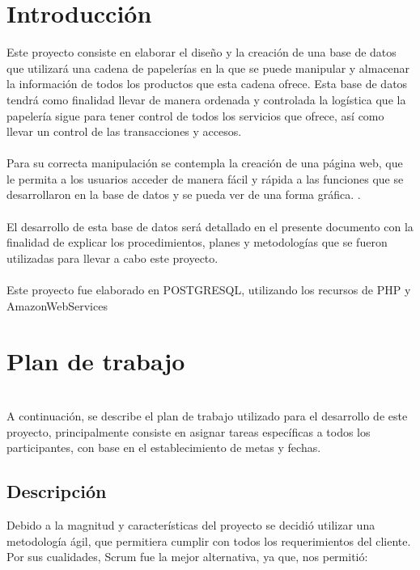 \documentclass[12pt,letterpaper]{article}
\begin{document}
	\restoregeometry
	\tableofcontents
	
	\newpage
	\section{Introducción}
	Este proyecto consiste en elaborar el diseño y la creación de una base de datos que utilizará una cadena de papelerías en la que se puede manipular y almacenar la información de todos los productos que esta cadena ofrece. Esta base de datos tendrá como finalidad llevar de manera ordenada y controlada la logística que la papelería sigue para tener control de todos los servicios que ofrece, así como llevar un control de las transacciones y accesos. 
	\\
	\\ Para su correcta manipulación se contempla la creación de una página web, que le permita a los usuarios  acceder de manera fácil y rápida a las funciones que se desarrollaron en la base de datos y se pueda ver de una forma gráfica. . 
	\\
	\\El desarrollo de esta base de datos será detallado en el presente documento con la finalidad de explicar los procedimientos, planes y metodologías que se fueron utilizadas para llevar a cabo este proyecto. 
	\\
	\\Este proyecto fue elaborado en POSTGRESQL, utilizando los recursos de PHP y AmazonWebServices
	
	
	\section{Plan de trabajo}\\
	A continuación, se describe el plan de trabajo utilizado para el desarrollo de este proyecto, principalmente consiste en asignar tareas específicas a todos los participantes, con base en el establecimiento de metas y fechas.
	
	\subsection{Descripción}
	Debido a la magnitud y características del proyecto se decidió utilizar una metodología ágil, que permitiera cumplir con todos los requerimientos del cliente.
	Por sus cualidades, Scrum fue la mejor alternativa, ya que, nos permitió:
	
\end{document}
